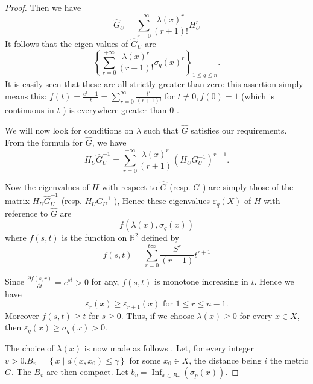\documentclass[lang=en,12pt]{beautybook}
\begin{document}
\begin{proof}
  Then we have
  \begin{equation*}
    \widehat{G}_U=\sum_{r=0}^{+\infty} \frac{\lambda(x)^r}{(r+1) !} H_U^r
  \end{equation*}
  It follows that the eigen values of $\widehat{G}_U$ are
  \begin{equation*}
    \left\{\sum_{r=0}^{+\infty} \frac{\lambda(x)^r}{(r+1) !} \sigma_q(x)^r\right\}_{1 \leq q \leq n} .
  \end{equation*}
  It is easily seen that these are all strictly greater than zero: this assertion simply means this: $f(t)=\frac{e^t-1}{t}=\sum_{r=0}^{\infty} \frac{t^r}{(r+1) !}$ for $t \neq 0, f(0)=1$ (which is continuous in $t$ ) is everywhere greater than $0$ .

  We will now look for conditions on $\lambda$ such that $\widehat{G}$ satisfies our requirements. From the formula for $\widehat{G}$, we have
  \begin{equation*}
    H_U \widehat{G}_U^{-1}=\sum_{r=0}^{+\infty} \frac{\lambda(x)^r}{(r+1)}\left(H_U G_U^{-1}\right)^{r+1} .
  \end{equation*}

  Now the eigenvalues of $H$ with respect to $\widehat{G}$ (resp. $G$ ) are simply those of the matrix $H_U \widehat{G}_U^{-1}$ (resp. $H_U G_U^{-1}$ ), Hence these eigenvalues $\varepsilon_q(X)$ of $H$ with reference to $\widehat{G}$ are
  \begin{equation*}
    f\left(\lambda(x), \sigma_q(x)\right)
  \end{equation*}
  where $f(s, t)$ is the function on $\mathbb{R}^2$ defined by
  \begin{equation*}
    f(s, t)=\sum_{r=0}^{t \infty} \frac{S^r}{(r+1)} t^{r+1}
  \end{equation*}

  Since $\frac{\partial f(s, r)}{\partial t}=e^{s t}>0$ for any, $f(s, t)$ is monotone increasing in $t$. Hence we have
  \begin{equation*}
    \varepsilon_r(x) \geqslant \varepsilon_{r+1}(x) \text { for } 1 \leqslant r \leqslant n-1 .
  \end{equation*}
  Moreover $f(s, t) \geqslant t$ for $s \geqslant 0$. Thus, if we choose $\lambda(x) \geqslant 0$ for every $x \in X$, then $\varepsilon_q(x) \geqslant \sigma_q(x)>0$.

  The choice of $\lambda(x)$ is now made as follows . Let, for every integer $v>0 . B_v=\left\{x \mid d\left(x, x_0\right) \leqslant \gamma\right\}$ for some $x_0 \in X$, the distance being $i$ the metric $G$. The $B_v$ are then compact. Let $b_v=\operatorname{Inf}_{x \in B_\gamma}\left(\sigma_p(x)\right)$.


\end{proof}
\end{document}

